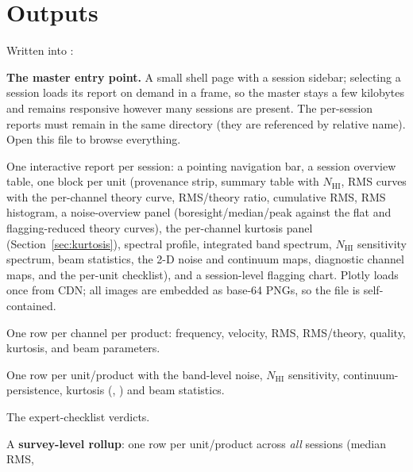 \documentclass[11pt,a4paper]{article}
\begin{document}
\section{Outputs}\label{sec:outputs}
Written into :
\begin{description}[leftmargin=1.6em,style=nextline]
  \item[\code{qa\_index.html}] \textbf{The master entry point.} A small shell
        page with a session sidebar; selecting a session loads its report on
        demand in a frame, so the master stays a few kilobytes and remains
        responsive however many sessions are present. The per-session reports
        must remain in the same directory (they are referenced by relative
        name). Open this file to browse everything.
  \item[\code{<obsid>\_qa\_report.html}] One interactive report per session: a
        pointing navigation bar, a session overview table, one block per
         unit (provenance strip, summary table with
        $N_{\mathrm{HI}}$, RMS curves with the per-channel theory curve,
        RMS/theory ratio, cumulative RMS, RMS histogram, a noise-overview panel
        (boresight/median/peak against the flat and flagging-reduced theory
        curves), the per-channel kurtosis panel (Section~\ref{sec:kurtosis}),
        spectral profile, integrated band spectrum, $N_{\mathrm{HI}}$
        sensitivity spectrum, beam statistics, the 2-D noise and continuum
        maps, diagnostic channel maps, and the per-unit checklist), and a
        session-level flagging chart. Plotly
        \citep{plotly} loads once from CDN; all images are embedded as base-64
        PNGs, so the file is self-contained.
  \item[\code{<obsid>\_channel\_qa.csv}] One row per channel per product:
        frequency, velocity, RMS, RMS/theory, quality, kurtosis, and beam
        parameters.
  \item[\code{<obsid>\_band\_summary.csv}] One row per unit/product with the
        band-level noise, $N_{\mathrm{HI}}$ sensitivity, continuum-persistence,
        kurtosis (, ) and beam
        statistics.
  \item[\code{<obsid>\_checklist.csv}] The expert-checklist verdicts.
  \item[\code{qa\_survey\_summary.\{json,csv\}}] A \textbf{survey-level rollup}:
        one row per unit/product across \emph{all} sessions (median RMS,

\end{description}
\end{document}
